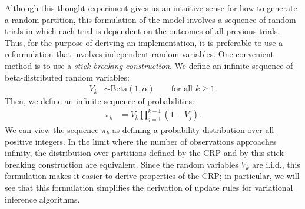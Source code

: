 \documentclass{article}
\begin{document}
Although this thought experiment gives us an intuitive sense for how to generate a random partition, this formulation of the model involves a sequence of random trials in which each trial is dependent on the outcomes of all previous trials.
Thus, for the purpose of deriving an implementation, it is preferable to use a reformulation that involves independent random variables.
One convenient method is to use a \emph{stick-breaking construction}.
We define an infinite sequence of beta-distributed random variables:
\begin{align*}
V_k &\sim \text{Beta}(1, \alpha) \qquad \text{for all $k \geq 1$}.
\end{align*}
Then, we define an infinite sequence of probabilities:
\begin{align}
\pi_k &= V_k \prod_{j=1}^{k-1} (1-V_j).
\label{eq:pi_crp}
\end{align}
We can view the sequence $\pi_k$ as defining a probability distribution over all positive integers.
In the limit where the number of observations approaches infinity, the distribution over partitions defined by the CRP and by this stick-breaking construction are equivalent.
Since the random variables $V_k$ are i.i.d., this formulation makes it easier to derive properties of the CRP; in particular, we will see that this formulation simplifies the derivation of update rules for variational inference algorithms.
\end{document}
